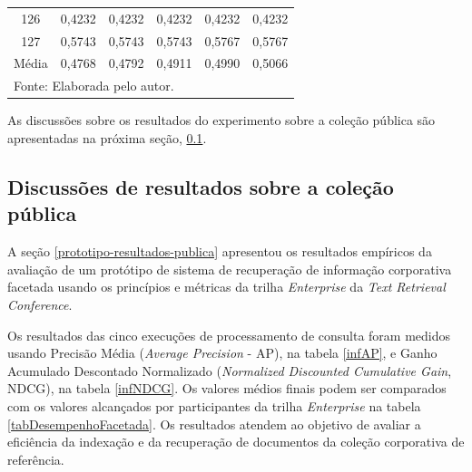 \begin{center}
\begin{longtable}{c|r|r|r|r|r}
126 & 0,4232 & 0,4232 & 0,4232 & 0,4232 & 0,4232 \\

127 & 0,5743 & 0,5743 & 0,5743 & 0,5767 & 0,5767 \\

Média & 0,4768 & 0,4792 & 0,4911 & 0,4990 & 0,5066 \\





\hline
\hline \multicolumn{6}{l}{Fonte: Elaborada pelo autor.}

\end{longtable}
\end{center}








As discussões sobre os resultados do experimento sobre a coleção pública são apresentadas na próxima seção, \ref{prototipo-discussoes-publica}.






\subsection{Discussões de resultados sobre a coleção pública}
\label{prototipo-discussoes-publica}

A seção \ref{prototipo-resultados-publica} apresentou os resultados empíricos da avaliação de um protótipo de sistema de recuperação de informação corporativa facetada usando os princípios e métricas da trilha \textit{Enterprise} da \textit{Text Retrieval Conference}. 

Os resultados das cinco execuções de processamento de consulta foram medidos usando Precisão Média (\textit{Average Precision} - AP), na tabela \ref{infAP}, e Ganho Acumulado Descontado Normalizado (\textit{Normalized Discounted Cumulative Gain}, NDCG), na tabela \ref{infNDCG}. Os valores médios finais podem ser comparados com os valores alcançados por participantes da trilha \textit{Enterprise} na tabela \ref{tabDesempenhoFacetada}. Os resultados atendem ao objetivo de avaliar a eficiência da indexação e da recuperação de documentos da coleção corporativa de referência.








